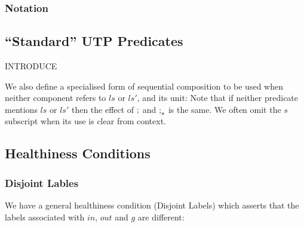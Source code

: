 \subsubsection{Notation}




\subsection{``Standard'' UTP Predicates}

INTRODUCE

We also define a specialised form of sequential composition
to be used when neither component refers to $ls$ or $ls'$,
and its unit:
Note that if neither predicate mentions $ls$ or $ls'$
then the effect of $\mathrel{;}$ and $\mathrel{;}_s$ is the same.
We often omit the $s$ subscript when its use is clear from context.

\subsection{Healthiness Conditions}

\subsubsection{Disjoint Lables}

We have a general healthiness condition (Disjoint Labels) which asserts
that the labels associated with $in$, $out$ and $g$
are different:

